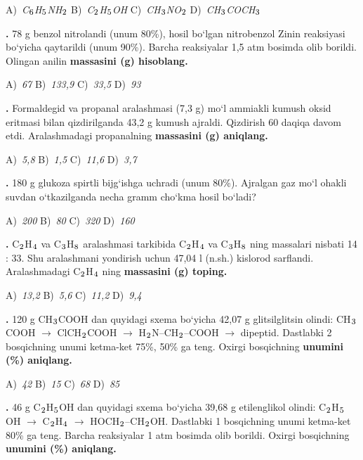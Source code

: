 \documentclass[11pt,a4paper]{article}
\renewcommand{\textsubscript}[1]{\ensuremath{_{\text{\fontsize{8}{8}\selectfont #1}}}}
\newcommand{\qn}[1]{\textbf{\fontsize{11.5}{13}\selectfont #1}}
\newcommand{\qsep}{\par\vspace{13pt}}
\begin{document}
\begin{multicols}{2}
\noindent A)~\textsl{C\textsubscript{6}H\textsubscript{5}NH\textsubscript{2}} \hfill B)~\textsl{C\textsubscript{2}H\textsubscript{5}OH} \hfill C)~\textsl{CH\textsubscript{3}NO\textsubscript{2}} \hfill D)~\textsl{CH\textsubscript{3}COCH\textsubscript{3}}\par
\qsep
\noindent\qn{23.} 78 g benzol nitrolandi (unum 80\%), hosil bo`lgan nitrobenzol Zinin reaksiyasi bo`yicha qaytarildi (unum 90\%). Barcha reaksiyalar 1,5 atm bosimda olib borildi. Olingan anilin \textbf{massasini (g) hisoblang.}

\noindent A)~\textsl{67} \hfill B)~\textsl{133,9} \hfill C)~\textsl{33,5} \hfill D)~\textsl{93}\par
\qsep
\noindent\qn{24.} Formaldegid va propanal aralashmasi (7,3 g) mo`l ammiakli kumush oksid eritmasi bilan qizdirilganda 43,2 g kumush ajraldi. Qizdirish 60 daqiqa davom etdi. Aralashmadagi propanalning \textbf{massasini (g) aniqlang.}

\noindent A)~\textsl{5,8} \hfill B)~\textsl{1,5} \hfill C)~\textsl{11,6} \hfill D)~\textsl{3,7}\par
\qsep
\noindent\qn{25.} 180 g glukoza spirtli bijg`ishga uchradi (unum 80\%). Ajralgan gaz mo`l ohakli suvdan o`tkazilganda necha gramm cho`kma hosil bo`ladi?

\noindent A)~\textsl{200} \hfill B)~\textsl{80} \hfill C)~\textsl{320} \hfill D)~\textsl{160}\par
\qsep
\noindent\qn{26.} C\textsubscript{2}H\textsubscript{4} va C\textsubscript{3}H\textsubscript{8} aralashmasi tarkibida C\textsubscript{2}H\textsubscript{4} va C\textsubscript{3}H\textsubscript{8} ning massalari nisbati 14 : 33. Shu aralashmani yondirish uchun 47,04 l (n.sh.) kislorod sarflandi. Aralashmadagi C\textsubscript{2}H\textsubscript{4} ning \textbf{massasini (g) toping.}

\noindent A)~\textsl{13,2} \hfill B)~\textsl{5,6} \hfill C)~\textsl{11,2} \hfill D)~\textsl{9,4}\par
\qsep
\noindent\qn{27.} 120 g CH\textsubscript{3}COOH dan quyidagi sxema bo`yicha 42,07 g glitsilglitsin olindi: CH\textsubscript{3}COOH $\to$ ClCH\textsubscript{2}COOH $\to$ H\textsubscript{2}N--CH\textsubscript{2}--COOH $\to$ dipeptid. Dastlabki 2 bosqichning unumi ketma-ket 75\%, 50\% ga teng. Oxirgi bosqichning \textbf{unumini (\%) aniqlang.}

\noindent A)~\textsl{42} \hfill B)~\textsl{15} \hfill C)~\textsl{68} \hfill D)~\textsl{85}\par
\qsep
\noindent\qn{28.} 46 g C\textsubscript{2}H\textsubscript{5}OH dan quyidagi sxema bo`yicha 39,68 g etilenglikol olindi: C\textsubscript{2}H\textsubscript{5}OH $\to$ C\textsubscript{2}H\textsubscript{4} $\to$ HOCH\textsubscript{2}--CH\textsubscript{2}OH. Dastlabki 1 bosqichning unumi ketma-ket 80\% ga teng. Barcha reaksiyalar 1 atm bosimda olib borildi. Oxirgi bosqichning \textbf{unumini (\%) aniqlang.}


\end{multicols}
\end{document}
